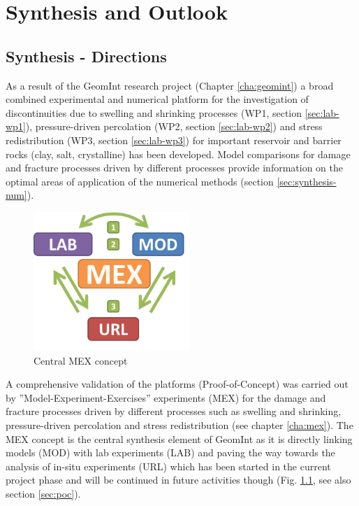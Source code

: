 \chapter{Synthesis and Outlook}
\label{cha:out}


\section{Synthesis - Directions}

As a result of the GeomInt research project (Chapter \ref{cha:geomint}) a broad combined experimental and numerical platform for the investigation of discontinuities due to swelling and shrinking processes (WP1, section \ref{sec:lab-wp1}), pressure-driven percolation (WP2, section \ref{sec:lab-wp2}) and stress redistribution (WP3, section \ref{sec:lab-wp3}) for important reservoir and barrier rocks (clay, salt, crystalline) has been developed. Model comparisons for damage and fracture processes driven by different processes provide information on the optimal areas of application of the numerical methods (section \ref{sec:synthesis-num}). 

\begin{figure}
\centering
\includegraphics[width=5.9cm]{figures/geomint-mex.png}
\caption{Central MEX concept}
\label{fig:synthesis-mex}
\end{figure}
A comprehensive validation of the platforms (\glqq{}Proof-of-Concept\grqq) was carried out by ''Model-Experiment-Exercises'' experiments (MEX) for the damage and fracture processes driven by different processes such as swelling and shrinking, pressure-driven percolation and stress redistribution (see chapter \ref{cha:mex}).
The MEX concept is the central synthesis element of GeomInt as it is directly linking models (MOD) with lab experiments (LAB) and paving the way towards the analysis of in-situ experiments (URL) which has been started in the current project phase and will be continued in future activities though (Fig. \ref{fig:synthesis-mex}, see also section \ref{sec:poc}).

